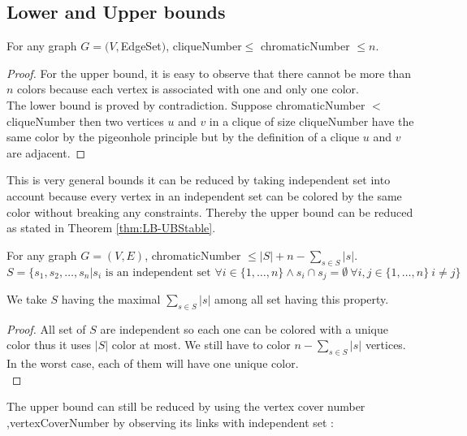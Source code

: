 \subsection{Lower and Upper bounds}
\begin{thm}
\label{thm:LB-UB}
For any graph $G=(V,$\gls{EdgeSet}$)$,  \gls{cliqueNumber}$ \leq $ \gls{chromaticNumber} $\leq n$.
\end{thm}

\begin{proof}
For the upper bound, it is easy to observe that there cannot be more than $n$ colors because each vertex is associated with one and only one color. \\
The lower bound is proved by contradiction. Suppose  \gls{chromaticNumber} $ < $ \gls{cliqueNumber} then two vertices $u$ and $v$ in a clique of size \gls{cliqueNumber} have the same color by the pigeonhole principle but by the definition of a clique $u$ and $v$ are adjacent.
\end{proof}

This is very general bounds it can be reduced by taking independent set into account because every vertex in an independent set can be colored by the same color without breaking any constraints. Thereby the upper bound can be reduced as stated in Theorem \ref{thm:LB-UBStable}.

\begin{thm}
\label{thm:LB-UBStable}
For any graph $G=(V,E)$, \gls{chromaticNumber} $ \leq |S| + n - \displaystyle\sum_{s \in S} |s| $.
\[S = \{s_1,s_2,\dots,s_n | s_i\text{ is an independent set }\forall i \in \{1,\dots,n\} \land  s_i \cap s_j = \emptyset\ \forall i,j \in \{1,\dots,n\}\ i \neq j \} \]

We take $S$ having the maximal $\displaystyle\sum_{s \in S} |s|$ among all set having this property.

\end{thm}

\begin{proof}
All set of $S$ are independent so each one can be colored with a unique color thus it uses $|S|$ color at most. We still have to color $n - \displaystyle\sum_{s \in S} |s| $ vertices. In the worst case, each of them will have one unique color. \\
\end{proof}

The upper bound can still be reduced by using the vertex cover number ,\gls{vertexCoverNumber} by observing its links with independent set :

